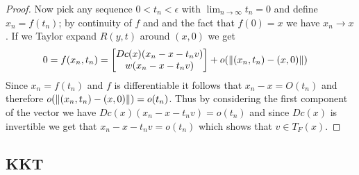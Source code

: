 \begin{proof}
Now pick any sequence $0 < t_n < \epsilon$ with $\lim_{n \to \infty} t_n = 0$ and define $x_n = f(t_n)$; by continuity of $f$ and and the 
fact that $f(0) = x$ we have $x_n \to x$.  If we Taylor expand $R(y,t)$ around $(x,0)$ we get
\begin{align*}
0 &= f(x_n, t_n) = \begin{bmatrix}
Dc(x) (x_n - x - t_n v) \\
w(x_n - x - t_n v)
\end{bmatrix}
+ o(\lVert (x_n,t_n) - (x,0) \rVert)
\end{align*}
Since $x_n = f(t_n)$ and $f$ is differentiable it follows that $x_n - x = O(t_n)$ and therefore $o(\lVert (x_n,t_n) - (x,0) \rVert) = o(t_n)$.  Thus by
considering the first component of the vector we have $Dc(x)  (x_n - x - t_n v)  = o(t_n)$ and since 
$Dc(x)$ is invertible we get that $x_n - x -t_n v = o(t_n)$ which shows that $v \in T_F(x)$.
\end{proof}

\subsection{KKT}

